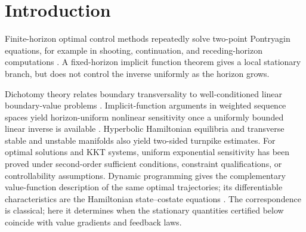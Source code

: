 \documentclass[twocolumn,nameyear,amsthm]{autart}
\numberwithin{equation}{section}
\begin{document}
\section{Introduction}\label{sec:intro}
Finite-horizon optimal control methods repeatedly solve two-point Pontryagin
equations, for example in shooting, continuation, and receding-horizon
computations \citep{bertsekas2017dynamic,grune2017nmpc}.
A fixed-horizon implicit function theorem gives a local stationary branch, but
does not control the inverse uniformly as the horizon grows.

Dichotomy theory relates boundary
transversality to well-conditioned linear boundary-value problems
\citep{coppel1978dichotomies}.
Implicit-function arguments in weighted sequence spaces yield horizon-uniform nonlinear
sensitivity once a uniformly bounded linear inverse is available
\citep{grune2021abstract}.  Hyperbolic Hamiltonian equilibria and transverse
stable and unstable manifolds also yield two-sided turnpike estimates.
For optimal solutions and KKT systems, uniform
exponential sensitivity has been proved under second-order sufficient
conditions, constraint qualifications, or controllability assumptions.
Dynamic programming gives the complementary value-function description of
the same optimal trajectories; its differentiable characteristics are the
Hamiltonian state--costate equations
\citep{bertsekas2017dynamic,sassano2025infinite}.
The correspondence is classical; here it determines when the stationary
quantities certified below coincide with value gradients and feedback laws.
\end{document}
